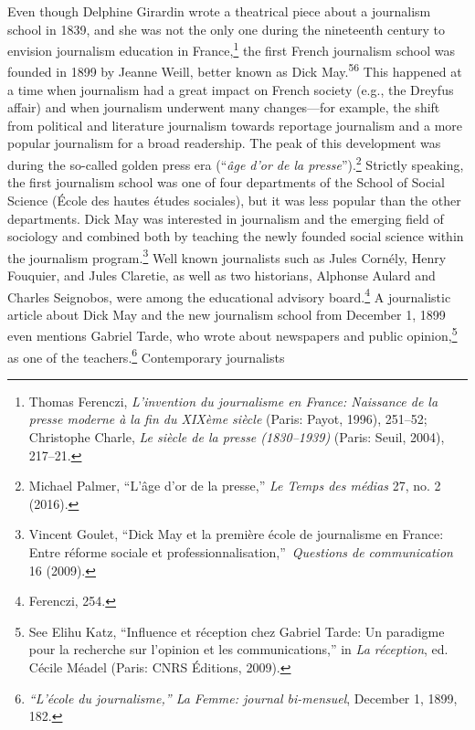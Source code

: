 \documentclass{tufte-handout}
\begin{document}
Even though Delphine Girardin wrote a theatrical piece about a
journalism school in 1839, and she was not the only one during the
nineteenth century to envision journalism education in
France,\footnote{Thomas Ferenczi, \emph{L'invention du journalisme en
  France: Naissance de la presse moderne à la fin du XIXème siècle}
  (Paris: Payot, 1996), 251--52; Christophe Charle, \emph{Le siècle de
  la presse (1830--1939)} (Paris: Seuil, 2004), 217--21.} the first
French journalism school was founded in 1899 by Jeanne Weill, better
known as Dick May.\textsuperscript{56} This happened at a time when journalism
had a great impact on French society (e.g., the Dreyfus affair) and when
journalism underwent many changes---for example, the shift from
political and literature journalism towards reportage journalism and a
more popular journalism for a broad readership. The peak of this
development was during the so-called golden press era (``\emph{âge d'or
de la presse}'').\footnote{Michael Palmer, ``L'âge d'or de la presse,''
  \emph{Le Temps des médias} 27, no. 2 (2016).} Strictly speaking, the
first journalism school was one of four departments of the School of
Social Science (École des hautes études sociales), but it was less
popular than the other departments. Dick May was interested in
journalism and the emerging field of sociology and combined both by
teaching the newly founded social science within the journalism
program.\footnote{Vincent Goulet, ``Dick May et la première école de
  journalisme en France: Entre réforme sociale et
  professionnalisation,''~\emph{Questions de communication} 16 (2009).}
Well known journalists such as Jules Cornély, Henry Fouquier, and Jules
Claretie, as well as two historians, Alphonse Aulard and Charles
Seignobos, were among the educational advisory board.\footnote{Ferenczi,
  254.} A journalistic article about Dick May and the new journalism
school from December 1, 1899 even mentions Gabriel Tarde, who wrote
about newspapers and public opinion,\footnote{See Elihu Katz,
  ``Influence et réception chez Gabriel Tarde: Un paradigme pour la
  recherche sur l'opinion et les communications,'' in \emph{La
  réception}, ed. Cécile Méadel (Paris: CNRS Éditions, 2009).} as one of
the teachers.\footnote{\emph{``L'école du journalisme,'' La Femme:
  journal bi-mensuel}, December 1, 1899, 182.} Contemporary journalists
\end{document}

